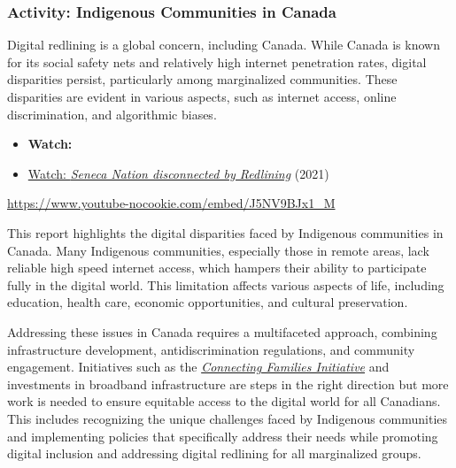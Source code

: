\documentclass[
  letterpaper,
  DIV=11,
  numbers=noendperiod]{scrreprt}
\providecommand{\tightlist}{%
  \setlength{\itemsep}{0pt}\setlength{\parskip}{0pt}}\usepackage{longtable,booktabs,array}
\begin{document}
\subsubsection{Activity: Indigenous Communities in
Canada}\label{activity-indigenous-communities-in-canada}

\begin{tcolorbox}[enhanced jigsaw, toprule=.15mm, colback=white, colframe=quarto-callout-note-color-frame, bottomtitle=1mm, leftrule=.75mm, coltitle=black, titlerule=0mm, rightrule=.15mm, colbacktitle=quarto-callout-note-color!10!white, left=2mm, title={Learning Activity}, opacitybacktitle=0.6, opacityback=0, breakable, toptitle=1mm, arc=.35mm, bottomrule=.15mm]

Digital redlining is a global concern, including Canada. While Canada is
known for its social safety nets and relatively high internet
penetration rates, digital disparities persist, particularly among
marginalized communities. These disparities are evident in various
aspects, such as internet access, online discrimination, and algorithmic
biases.

\begin{itemize}
\tightlist
\item
  \textbf{Watch:}
\item
  \href{https://www.youtube.com/watch?v=J5NV9BJx1_M}{Watch: \emph{Seneca
  Nation disconnected by Redlining}} (2021)
\end{itemize}

\url{https://www.youtube-nocookie.com/embed/J5NV9BJx1_M}

This report highlights the digital disparities faced by Indigenous
communities in Canada. Many Indigenous communities, especially those in
remote areas, lack reliable high speed internet access, which hampers
their ability to participate fully in the digital world. This limitation
affects various aspects of life, including education, health care,
economic opportunities, and cultural preservation.

Addressing these issues in Canada requires a multifaceted approach,
combining infrastructure development, antidiscrimination regulations,
and community engagement. Initiatives such as the
\href{https://ised-isde.canada.ca/site/connecting-families/en}{\emph{Connecting
Families Initiative}} and investments in broadband infrastructure are
steps in the right direction but more work is needed to ensure equitable
access to the digital world for all Canadians. This includes recognizing
the unique challenges faced by Indigenous communities and implementing
policies that specifically address their needs while promoting digital
inclusion and addressing digital redlining for all marginalized groups.

\end{tcolorbox}
\end{document}
